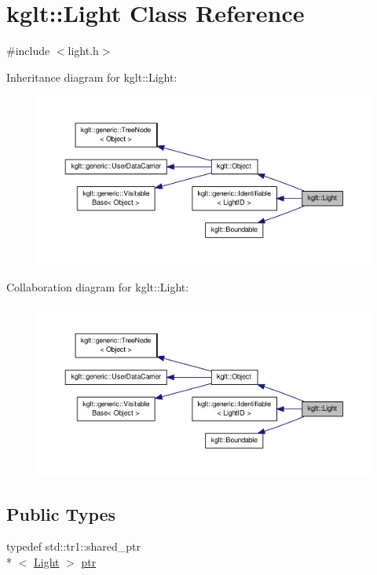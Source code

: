 \hypertarget{classkglt_1_1_light}{\section{kglt\-:\-:Light Class Reference}
\label{classkglt_1_1_light}
}


{\ttfamily \#include $<$light.\-h$>$}



Inheritance diagram for kglt\-:\-:Light\-:\nopagebreak
\begin{figure}[H]
\begin{center}
\leavevmode
\includegraphics[width=350pt]{classkglt_1_1_light__inherit__graph}
\end{center}
\end{figure}


Collaboration diagram for kglt\-:\-:Light\-:\nopagebreak
\begin{figure}[H]
\begin{center}
\leavevmode
\includegraphics[width=350pt]{classkglt_1_1_light__coll__graph}
\end{center}
\end{figure}
\subsection*{Public Types}
\begin{DoxyCompactItemize}
\item 
typedef std\-::tr1\-::shared\-\_\-ptr\\*
$<$ \hyperlink{classkglt_1_1_light}{Light} $>$ \hyperlink{classkglt_1_1_light_a85d7b5f4119c252f9f2851b55c254607}{ptr}
\end{DoxyCompactItemize}
